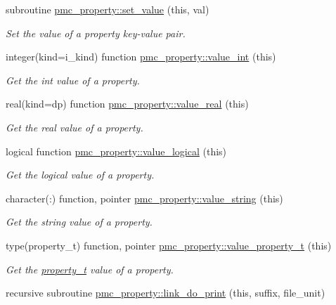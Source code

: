 \begin{DoxyCompactItemize}
subroutine \mbox{\hyperlink{namespacepmc__property_a5833a104f563f288fe180166bc4939b8}{pmc\+\_\+property\+::set\+\_\+value}} (this, val)
\begin{DoxyCompactList}\small\item\em Set the value of a property key-\/value pair. \end{DoxyCompactList}\item 
integer(kind=i\+\_\+kind) function \mbox{\hyperlink{namespacepmc__property_a5f75da984050d4621460b7530f4edb11}{pmc\+\_\+property\+::value\+\_\+int}} (this)
\begin{DoxyCompactList}\small\item\em Get the int value of a property. \end{DoxyCompactList}\item 
real(kind=dp) function \mbox{\hyperlink{namespacepmc__property_a0ef35a2bc42efede42972be617c65e27}{pmc\+\_\+property\+::value\+\_\+real}} (this)
\begin{DoxyCompactList}\small\item\em Get the real value of a property. \end{DoxyCompactList}\item 
logical function \mbox{\hyperlink{namespacepmc__property_a404e309153854ccab86eb10318fcbdcf}{pmc\+\_\+property\+::value\+\_\+logical}} (this)
\begin{DoxyCompactList}\small\item\em Get the logical value of a property. \end{DoxyCompactList}\item 
character(\+:) function, pointer \mbox{\hyperlink{namespacepmc__property_ad5dcdbd8450ec28999baff573c4edada}{pmc\+\_\+property\+::value\+\_\+string}} (this)
\begin{DoxyCompactList}\small\item\em Get the string value of a property. \end{DoxyCompactList}\item 
type(property\+\_\+t) function, pointer \mbox{\hyperlink{namespacepmc__property_a793853ad03f64d47abf8df8d637e53c6}{pmc\+\_\+property\+::value\+\_\+property\+\_\+t}} (this)
\begin{DoxyCompactList}\small\item\em Get the \mbox{\hyperlink{structpmc__property_1_1property__t}{property\+\_\+t}} value of a property. \end{DoxyCompactList}\item 
recursive subroutine \mbox{\hyperlink{namespacepmc__property_a4a9f323c08b7fe0a6855eade5aadf018}{pmc\+\_\+property\+::link\+\_\+do\+\_\+print}} (this, suffix, file\+\_\+unit)

\end{DoxyCompactItemize}
